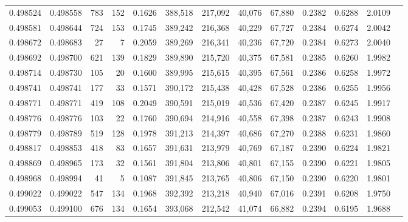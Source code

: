 \begin{tabular}{rrrrrrrrrrrrr}
0.498524 & 0.498558 &   783 &   152 &                                     0.1626 & 388,518 & 217,092 &  40,076 &  67,880 & 0.2382 & 0.6288 & 2.0109 \\
0.498581 & 0.498644 &   724 &   153 &                                     0.1745 & 389,242 & 216,368 &  40,229 &  67,727 & 0.2384 & 0.6274 & 2.0042 \\
0.498672 & 0.498683 &    27 &     7 &                                     0.2059 & 389,269 & 216,341 &  40,236 &  67,720 & 0.2384 & 0.6273 & 2.0040 \\
0.498692 & 0.498700 &   621 &   139 &                                     0.1829 & 389,890 & 215,720 &  40,375 &  67,581 & 0.2385 & 0.6260 & 1.9982 \\
0.498714 & 0.498730 &   105 &    20 &                                     0.1600 & 389,995 & 215,615 &  40,395 &  67,561 & 0.2386 & 0.6258 & 1.9972 \\
0.498741 & 0.498741 &   177 &    33 &                                     0.1571 & 390,172 & 215,438 &  40,428 &  67,528 & 0.2386 & 0.6255 & 1.9956 \\
0.498771 & 0.498771 &   419 &   108 &                                     0.2049 & 390,591 & 215,019 &  40,536 &  67,420 & 0.2387 & 0.6245 & 1.9917 \\
0.498776 & 0.498776 &   103 &    22 &                                     0.1760 & 390,694 & 214,916 &  40,558 &  67,398 & 0.2387 & 0.6243 & 1.9908 \\
0.498779 & 0.498789 &   519 &   128 &                                     0.1978 & 391,213 & 214,397 &  40,686 &  67,270 & 0.2388 & 0.6231 & 1.9860 \\
0.498817 & 0.498853 &   418 &    83 &                                     0.1657 & 391,631 & 213,979 &  40,769 &  67,187 & 0.2390 & 0.6224 & 1.9821 \\
0.498869 & 0.498965 &   173 &    32 &                                     0.1561 & 391,804 & 213,806 &  40,801 &  67,155 & 0.2390 & 0.6221 & 1.9805 \\
0.498968 & 0.498994 &    41 &     5 &                                     0.1087 & 391,845 & 213,765 &  40,806 &  67,150 & 0.2390 & 0.6220 & 1.9801 \\
0.499022 & 0.499022 &   547 &   134 &                                     0.1968 & 392,392 & 213,218 &  40,940 &  67,016 & 0.2391 & 0.6208 & 1.9750 \\
0.499053 & 0.499100 &   676 &   134 &                                     0.1654 & 393,068 & 212,542 &  41,074 &  66,882 & 0.2394 & 0.6195 & 1.9688 \\

\end{tabular}
